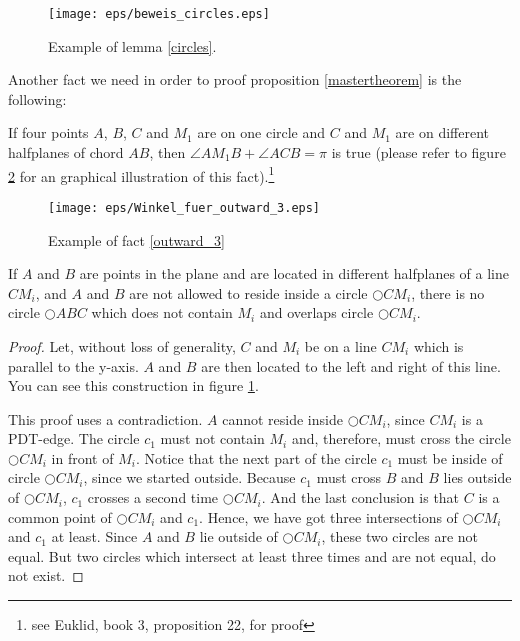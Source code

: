 \begin{figure}[h!]
\centering
\texttt{[image: eps/beweis\_circles.eps]}
\caption{Example of lemma \ref{circles}. }
\label{fig:beweis_circles}
\end{figure}
Another fact we need in order to proof proposition \ref{mastertheorem} is the following:
\begin{fact}
\label{outward_3}
If four points $A $, $B $, $C $ and $M_1 $ are on one circle and $C $ and $M_1 $ are on different halfplanes of chord $AB $, then $\angle{AM_1B} + \angle{ACB} =\pi $ is true (please refer to figure \ref{fig:winkel_fuer_outward_3} for an graphical illustration of this fact).\footnote{see Euklid, book 3, proposition 22, for proof}
\end{fact}

\begin{figure}[h!]
\centering
\texttt{[image: eps/Winkel\_fuer\_outward\_3.eps]}
\caption{Example of fact \ref{outward_3} }
\label{fig:winkel_fuer_outward_3}
\end{figure}

\begin{lemma}
\label{circles}
If $A $ and $B $ are points in the plane and are located in different halfplanes of a line $CM_i $, and $A $ and $B $ are not allowed to reside inside a circle $\bigcirc{CM_i} $, there is no circle $\bigcirc{ABC} $ which does not contain $M_i $ and overlaps circle $\bigcirc{CM_i} $.
\end{lemma}
\begin{proof}
 Let, without loss of generality, $C $ and $M_i $ be on a line $CM_i $ which is parallel to the y-axis.
$A $ and $B $ are then located to the left and right of this line.
You can see this construction in figure \ref{fig:beweis_circles}.

This proof uses a contradiction. %
$A $ cannot reside inside $\bigcirc{CM_i} $, since $CM_i $ is a PDT-edge.
The circle $c_1 $ must not contain $M_i $ and, therefore, must cross the circle $\bigcirc{CM_i} $ in front of $M_i $.
Notice that the next part of the circle $c_1 $ must be inside of circle $\bigcirc{CM_i} $, since we started outside.
Because $c_1 $ must cross $B $ and $B $ lies outside of $\bigcirc{CM_i} $, $c_1 $ crosses a second time $\bigcirc{CM_i} $.
And the last conclusion is that $C $ is a common point of $\bigcirc{CM_i} $ and $c_1 $.
Hence, we have got three intersections of $\bigcirc{CM_i} $ and $c_1 $ at least.
Since $A $ and $B $ lie outside of $\bigcirc{CM_i} $, these two circles are not equal.
But two circles which intersect at least three times and are not equal, do not exist.
\end{proof}

